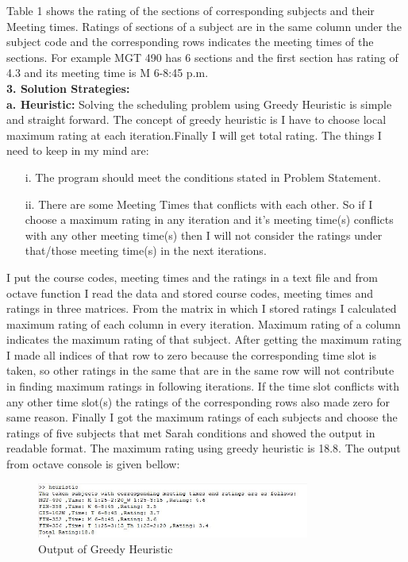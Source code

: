 \documentclass[paper=letter, fontsize=11pt]{scrartcl} %
\begin{document}
Table 1 shows the rating of the sections of corresponding subjects and their Meeting times. Ratings of sections of a subject are in the same column under the subject code and the corresponding rows indicates the meeting times of the sections. For example MGT 490 has 6 sections and the first section has rating of 4.3 and its meeting time is M 6-8:45 p.m.\\
\newline
\Large \textbf{3. Solution Strategies:}\\
 \normalsize \textbf{a. Heuristic:}
Solving the scheduling problem using Greedy Heuristic is simple and straight forward. The concept of greedy heuristic is 
I have to choose local maximum rating at each iteration.Finally I will get total rating. The things I need to keep in 
my mind are:  
\begin{enumerate}[align=left,style=nextline,leftmargin=1.5cm,labelsep=\parindent,font=\normalfont]
\item[i.] The program should meet the conditions stated in Problem Statement.
\item[ii.] There are some Meeting Times that conflicts with each other. So if I choose a maximum rating in any iteration and
it's meeting time(s) conflicts with any other meeting time(s) then I will not consider the ratings under that/those 
meeting time(s) in the next iterations.
\end{enumerate}  

I put the course codes, meeting times and the ratings in a text file and from octave function I read the data and stored course codes, meeting times and ratings in three matrices. From the matrix in which I stored ratings I calculated maximum rating of each column in every iteration. Maximum rating of a column indicates the maximum rating of that subject. After getting the maximum rating I made all indices of that row to zero because the corresponding time slot is taken, so other ratings in the same that are in the same row will not contribute in finding maximum ratings in following iterations. If the time slot conflicts with any other time slot(s) the ratings of the corresponding rows also made zero for same reason. Finally I got the maximum ratings of each subjects and choose the ratings of five subjects that met Sarah conditions and showed the output in readable format. The maximum rating using greedy heuristic is 18.8.
The output from octave console is given bellow:

\begin{figure}[h!]
  
  \centering
    \includegraphics[width=0.8\textwidth]{heuristic}
    \caption{Output of Greedy Heuristic}
\end{figure}
\end{document}
